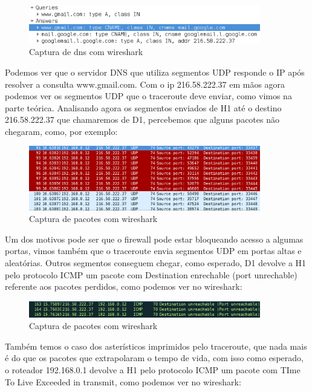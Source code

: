 \begin{figure}[h]
  \centering
  \includegraphics[width=0.9\textwidth]{figuras/f5.eps}
  \caption{Captura de dns com wireshark}
  \label{fig:f5}
\end{figure}

Podemos ver que o servidor DNS que utiliza segmentos UDP responde o IP após
resolver a consulta www.gmail.com. Com o ip 216.58.222.37 em mãos agora podemos
 ver os segmentos UDP que o traceroute deve enviar, como vimos na parte teórica.
Analisando agora os segmentos enviados de H1 até o destino 216.58.222.37 que
chamaremos de D1, percebemos que alguns pacotes não chegaram, como, por exemplo:

\begin{figure}[h]
  \centering
  \includegraphics[width=0.9\textwidth]{figuras/f6.eps}
  \caption{Captura de pacotes com wireshark}
  \label{fig:f6}
\end{figure}

Um dos motivos pode ser que o firewall pode estar bloqueando acesso a algumas
portas, vimos também que o traceroute envia segmentos UDP em portas altas e
aleatórias. Outros segmentos conseguem chegar, como esperado, D1 devolve a H1
pelo protocolo ICMP um pacote com Destination enrechable (port unrechable)
referente aos pacotes perdidos, como podemos ver no wireshark:

\begin{figure}[h]
  \centering
  \includegraphics[width=0.9\textwidth]{figuras/f7.eps}
  \caption{Captura de pacotes com wireshark}
  \label{fig:f7}
\end{figure}

Também temos o caso dos  asterísticos imprimidos pelo traceroute, que nada mais
é do que os pacotes que extrapolaram o tempo de vida, com isso como esperado, o
roteador 192.168.0.1 devolve a H1 pelo protocolo ICMP um pacote com TIme To
Live Exceeded in transmit, como podemos ver no wireshark:

